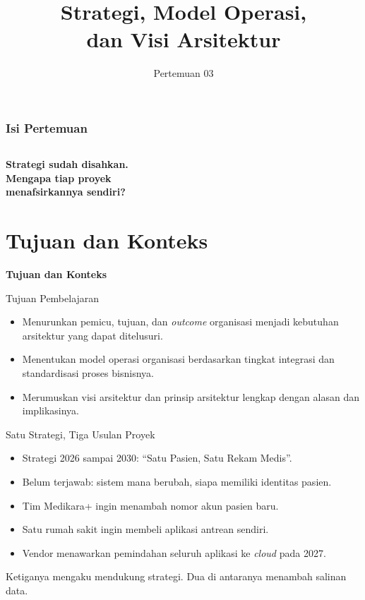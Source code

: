 \documentclass[aspectratio=169, table, 12pt]{beamer}
\title{\Huge Strategi, Model Operasi,\\ \vspace{10pt} dan Visi Arsitektur}
\date{Pertemuan 03}
\begin{document}
\begin{frame}
  \titlepage
\end{frame}

\begin{frame}
  \frametitle{Isi Pertemuan}
  \vspace{14pt}
  \begin{columns}[t]
    {\small\tableofcontents[sections={1-3}]}

    {\small\tableofcontents[sections={4-6}]}
  \end{columns}
\end{frame}

\begin{frame}{\hfill}
  \centering
  \Huge{\textbf{Strategi sudah disahkan.\\Mengapa tiap proyek\\menafsirkannya sendiri?}}
\end{frame}

\section{Tujuan dan Konteks}

\begin{frame}{\hfill}
  \centering
  \Huge{\textbf{Tujuan dan Konteks}}
\end{frame}

\begin{frame}{{\Large Tujuan Pembelajaran}}
  \vspace{10pt}
  \begin{itemize}
    \item Menurunkan pemicu, tujuan, dan \textit{outcome} organisasi menjadi kebutuhan arsitektur
          yang dapat ditelusuri.
    \item Menentukan model operasi organisasi berdasarkan tingkat integrasi dan standardisasi
          proses bisnisnya.
    \item Merumuskan visi arsitektur dan prinsip arsitektur lengkap dengan alasan dan
          implikasinya.
  \end{itemize}
\end{frame}

\begin{frame}{{\Large Satu Strategi, Tiga Usulan Proyek}}
  \vspace{10pt}
  \begin{itemize}
    \item Strategi 2026 sampai 2030: ``Satu Pasien, Satu Rekam Medis''.
    \item Belum terjawab: sistem mana berubah, siapa memiliki identitas pasien.
    \item Tim Medikara+ ingin menambah nomor akun pasien baru.
    \item Satu rumah sakit ingin membeli aplikasi antrean sendiri.
    \item Vendor menawarkan pemindahan seluruh aplikasi ke \textit{cloud} pada 2027.
  \end{itemize}
  \vspace{6pt}
  {\small Ketiganya mengaku mendukung strategi. Dua di antaranya menambah salinan data.}
\end{frame}
\end{document}
